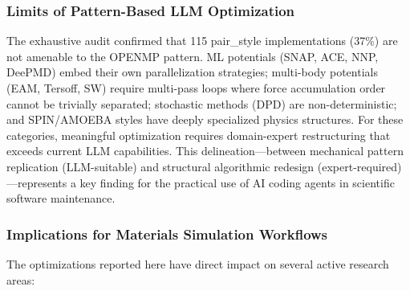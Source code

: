 \documentclass[
  11pt,
]{article}
\begin{document}
\subsubsection{Limits of Pattern-Based LLM
Optimization}\label{limits-of-pattern-based-llm-optimization}

The exhaustive audit confirmed that 115 pair\_style implementations
(37\%) are not amenable to the OPENMP pattern. ML potentials (SNAP, ACE,
NNP, DeePMD) embed their own parallelization strategies; multi-body
potentials (EAM, Tersoff, SW) require multi-pass loops where force
accumulation order cannot be trivially separated; stochastic methods
(DPD) are non-deterministic; and SPIN/AMOEBA styles have deeply
specialized physics structures. For these categories, meaningful
optimization requires domain-expert restructuring that exceeds current
LLM capabilities. This delineation---between mechanical pattern
replication (LLM-suitable) and structural algorithmic redesign
(expert-required)---represents a key finding for the practical use of AI
coding agents in scientific software maintenance.

\subsubsection{Implications for Materials Simulation
Workflows}\label{implications-for-materials-simulation-workflows}

The optimizations reported here have direct impact on several active
research areas:
\end{document}
